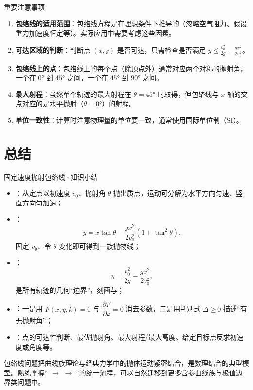 \documentclass[a4paper,11pt]{ctexart}
\begin{document}
\begin{notebox}{重要注意事项}
\begin{enumerate}
    \item \textbf{包络线的适用范围}：包络线方程是在理想条件下推导的（忽略空气阻力、假设重力加速度恒定等）。实际应用中需要考虑这些因素。
    
    \item \textbf{可达区域的判断}：判断点 $(x, y)$ 是否可达，只需检查是否满足 $y \leq \frac{v_0^2}{2g} - \frac{gx^2}{2v_0^2}$。
    
    \item \textbf{包络线上的点}：包络线上的每个点（除顶点外）通常对应两个对称的抛射角，一个在 $0°$ 到 $45°$ 之间，一个在 $45°$ 到 $90°$ 之间。
    
    \item \textbf{最大射程}：虽然单个轨迹的最大射程在 $\theta = 45°$ 时取得，但包络线与 $x$ 轴的交点对应的是水平抛射（$\theta = 0°$）的射程。
    
    \item \textbf{单位一致性}：计算时注意物理量的单位要一致，通常使用国际单位制（SI）。
\end{enumerate}
\end{notebox}

\section{总结}

\begin{summarybox}{固定速度抛射包络线·知识小结}
\begin{itemize}
  \item {}：从定点以初速度 $v_0$、抛射角 $\theta$ 抛出质点，运动可分解为水平方向匀速、竖直方向匀加速；
  \item {}：
  \[
    y = x\tan\theta - \frac{gx^2}{2v_0^2}(1+\tan^2\theta),
  \]
  固定 $v_0$、令 $\theta$ 变化即可得到一族抛物线；
  \item {}：
  \[
    y = \frac{v_0^2}{2g} - \frac{gx^2}{2v_0^2},
  \]
  是所有轨迹的几何“边界”，刻画与；
  \item {}：一是用 $F(x,y,k)=0$ 与 $\dfrac{\partial F}{\partial k}=0$ 消去参数，二是用判别式 $\Delta\ge0$ 描述“有无抛射角”；
  \item {}：点的可达性判断、最优抛射角、最大射程/最大高度、给定目标点反求初速度或角度等。
\end{itemize}
\end{summarybox}

包络线问题把曲线族理论与经典力学中的抛体运动紧密结合，是数理结合的典型模型。熟练掌握“ $\rightarrow$  $\rightarrow$ ”的统一流程，可以自然迁移到更多含参曲线族与极值边界类问题中。

\end{document}
